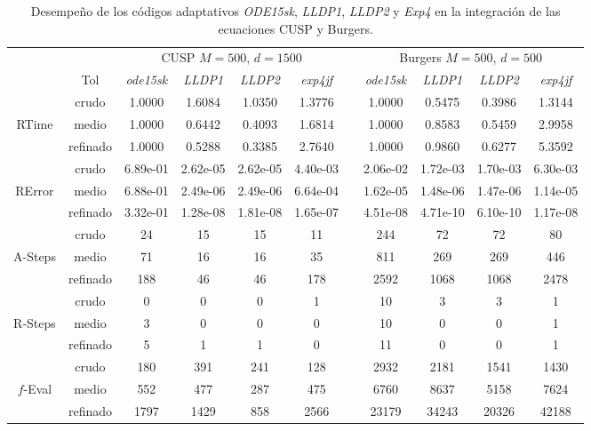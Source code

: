 \begin{table}[htb]
	\caption{Desempeño de los códigos adaptativos \emph{ODE15sk}, \emph{LLDP1}, \emph{LLDP2} y \emph{Exp4} en la integración de las ecuaciones  CUSP y Burgers.}
	\label{tab:cuspburg}
	\begin{adjustbox}{width=0.95\columnwidth,center}
		\begin{tabular}{ccccccccccc}
			\hline
			&  & \multicolumn{4}{c}{CUSP $M=500$, $d=1500$} &  & \multicolumn{4}{c}{Burgers $M=500$, $d=500$} \\
			\cline{3-6}\cline{8-11} & Tol & \emph{ode15sk} & \emph{LLDP1} & \emph{LLDP2} & \emph{exp4jf} &  & \emph{ode15sk} & \emph{LLDP1} & \emph{LLDP2} & \emph{exp4jf} \\
			\hline
			& crudo & 1.0000 & 1.6084 & 1.0350 & 1.3776 &  & 1.0000 & 0.5475 & 0.3986 & 1.3144 \\
			RTime & medio & 1.0000 & 0.6442 & 0.4093 & 1.6814 &  & 1.0000 & 0.8583 & 0.5459 & 2.9958 \\
			& refinado & 1.0000 & 0.5288 & 0.3385 & 2.7640 &  & 1.0000 & 0.9860 & 0.6277 & 5.3592 \\
			\hline
			& crudo & 6.89e-01 & 2.62e-05 & 2.62e-05 & 4.40e-03 &  & 2.06e-02 & 1.72e-03 & 1.70e-03 & 6.30e-03 \\
			RError & medio & 6.88e-01 & 2.49e-06 & 2.49e-06 & 6.64e-04 &  & 1.62e-05 & 1.48e-06 & 1.47e-06 & 1.14e-05 \\
			& refinado & 3.32e-01 & 1.28e-08 & 1.81e-08 & 1.65e-07 &  & 4.51e-08 & 4.71e-10 & 6.10e-10 & 1.17e-08 \\
			\hline
			& crudo & 24 & 15 & 15 & 11 &  & 244 & 72 & 72 & 80 \\
			A-Steps & medio & 71 & 16 & 16 & 35 &  & 811 & 269 & 269 & 446 \\
			& refinado & 188 & 46 & 46 & 178 &  & 2592 & 1068 & 1068 & 2478 \\
			\hline
			& crudo & 0 & 0 & 0 & 1 &  & 10 & 3 & 3 & 1 \\
			R-Steps & medio & 3 & 0 & 0 & 0 &  & 10 & 0 & 0 & 1 \\
			& refinado & 5 & 1 & 1 & 0 &  & 11 & 0 & 0 & 1 \\
			\hline
			& crudo & 180 & 391 & 241 & 128 &  & 2932 & 2181 & 1541 & 1430 \\
			$f$-Eval & medio & 552 & 477 & 287 & 475 &  & 6760 & 8637 & 5158 & 7624 \\
			& refinado & 1797 & 1429 & 858 & 2566 &  & 23179 & 34243 & 20326 & 42188 \\
			\hline

\end{tabular}
\end{adjustbox}
\end{table}
